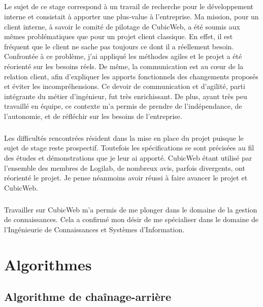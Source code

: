 \documentclass {report}
\begin{document}
\paragraph{}
Le sujet de ce stage correspond à un travail de recherche pour le développement interne et consistait à apporter une plus-value à l'entreprise. Ma mission, pour un client interne, à savoir le comité de pilotage de CubicWeb, a été soumis aux mêmes problématiques que pour un projet client classique. En effet, il est fréquent que le client ne sache pas toujours ce dont il a réellement besoin. Confrontée à ce problème, j'ai appliqué les méthodes agiles et le projet a été réorienté sur les besoins réels. De même, la communication est au cœur de la relation client, afin d'expliquer les apports fonctionnels des changements proposés et éviter les incompréhensions. Ce devoir de communication et d'agilité, parti intégrante du métier d'ingénieur, fut très enrichissant. De plus, ayant très peu travaillé en équipe, ce contexte m'a permis de prendre de l'indépendance, de l'autonomie, et de réfléchir sur les besoins de l'entreprise.

\paragraph{}
Les difficultés rencontrées résident dans la mise en place du projet puisque le sujet de stage reste prospectif. Toutefois les spécifications se sont précisées au fil des études et démonstrations que je leur ai apporté. CubicWeb étant utilisé par l'ensemble des membres de Logilab, de nombreux avis, parfois divergents, ont réorienté le projet. Je pense néanmoins avoir réussi à faire avancer le projet et CubicWeb.

\paragraph{}
Travailler sur CubicWeb m'a permis de me plonger dans le domaine de la gestion de connaissances. Cela a confirmé mon désir de me spécialiser dans le domaine de l'Ingénieurie de Connaissances et Systèmes d'Information.


\appendix


\chapter{Algorithmes}
\section{Algorithme de chaînage-arrière}
\end{document}
